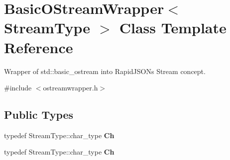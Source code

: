 \hypertarget{class_basic_o_stream_wrapper}{}\section{Basic\+O\+Stream\+Wrapper$<$ Stream\+Type $>$ Class Template Reference}
\label{class_basic_o_stream_wrapper}


Wrapper of {\ttfamily std\+::basic\+\_\+ostream} into Rapid\+J\+S\+ON\textquotesingle{}s Stream concept.  




{\ttfamily \#include $<$ostreamwrapper.\+h$>$}

\subsection*{Public Types}
\begin{DoxyCompactItemize}
\item 
typedef Stream\+Type\+::char\+\_\+type {\bfseries Ch}\hypertarget{class_basic_o_stream_wrapper_aafc6276f1f5cc0b8d45d137584d380bb}{}\label{class_basic_o_stream_wrapper_aafc6276f1f5cc0b8d45d137584d380bb}

\item 
typedef Stream\+Type\+::char\+\_\+type {\bfseries Ch}\hypertarget{class_basic_o_stream_wrapper_aafc6276f1f5cc0b8d45d137584d380bb}{}\label{class_basic_o_stream_wrapper_aafc6276f1f5cc0b8d45d137584d380bb}

\end{DoxyCompactItemize}
